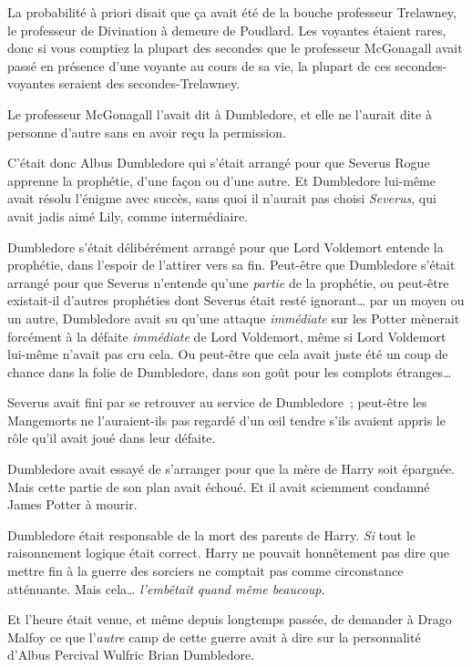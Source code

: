 La probabilité à priori disait que ça avait été de la bouche professeur Trelawney, le professeur de Divination à demeure de Poudlard. Les voyantes étaient rares, donc si vous comptiez la plupart des secondes que le professeur McGonagall avait passé en présence d'une voyante au cours de sa vie, la plupart de ces secondes-voyantes seraient des secondes-Trelawney.

Le professeur McGonagall l'avait dit à Dumbledore, et elle ne l'aurait dite à personne d'autre sans en avoir reçu la permission.

C'était donc Albus Dumbledore qui s'était arrangé pour que Severus Rogue apprenne la prophétie, d'une façon ou d'une autre. Et Dumbledore lui-même avait résolu l'énigme avec succès, sans quoi il n'aurait pas choisi \emph{Severus}, qui avait jadis aimé Lily, comme intermédiaire.

Dumbledore s'était délibérément arrangé pour que Lord Voldemort entende la prophétie, dans l'espoir de l'attirer vers sa fin. Peut-être que Dumbledore s'était arrangé pour que Severus n'entende qu'une \emph{partie} de la prophétie, ou peut-être existait-il d'autres prophéties dont Severus était resté ignorant… par un moyen ou un autre, Dumbledore avait su qu'une attaque \emph{immédiate} sur les Potter mènerait forcément à la défaite \emph{immédiate} de Lord Voldemort, même si Lord Voldemort lui-même n'avait pas cru cela. Ou peut-être que cela avait juste été un coup de chance dans la folie de Dumbledore, dans son goût pour les complots étranges…

Severus avait fini par se retrouver au service de Dumbledore~; peut-être les Mangemorts ne l'auraient-ils pas regardé d'un œil tendre s'ils avaient appris le rôle qu'il avait joué dans leur défaite.

Dumbledore avait essayé de s'arranger pour que la mère de Harry soit épargnée. Mais cette partie de son plan avait échoué. Et il avait sciemment condamné James Potter à mourir.

Dumbledore était responsable de la mort des parents de Harry. \emph{Si} tout le raisonnement logique était correct. Harry ne pouvait honnêtement pas dire que mettre fin à la guerre des sorciers ne comptait pas comme circonstance atténuante. Mais cela… \emph{l'embêtait quand même beaucoup}.

Et l'heure était venue, et même depuis longtemps passée, de demander à Drago Malfoy ce que l'\emph{autre} camp de cette guerre avait à dire sur la personnalité d'Albus Percival Wulfric Brian Dumbledore.

